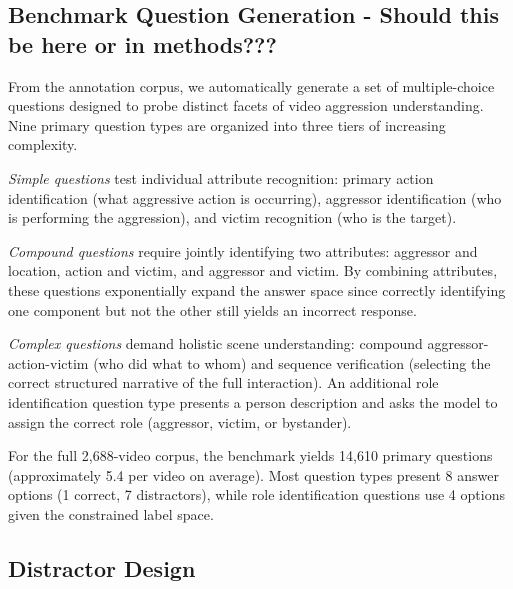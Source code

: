 \subsection{Benchmark Question Generation - Should this be here or in methods???}

From the annotation corpus, we automatically generate a set of multiple-choice questions designed to probe distinct facets of video aggression understanding.
Nine primary question types are organized into three tiers of increasing complexity.

\textit{Simple questions} test individual attribute recognition: primary action identification (what aggressive action is occurring), aggressor identification (who is performing the aggression), and victim recognition (who is the target).

\textit{Compound questions} require jointly identifying two attributes: aggressor and location, action and victim, and aggressor and victim.
By combining attributes, these questions exponentially expand the answer space since correctly identifying one component but not the other still yields an incorrect response.

\textit{Complex questions} demand holistic scene understanding: compound aggressor-action-victim (who did what to whom) and sequence verification (selecting the correct structured narrative of the full interaction).
An additional role identification question type presents a person description and asks the model to assign the correct role (aggressor, victim, or bystander).

For the full 2,688-video corpus, the benchmark yields 14,610 primary questions (approximately 5.4 per video on average).
Most question types present 8 answer options (1 correct, 7 distractors), while role identification questions use 4 options given the constrained label space.

\subsection{Distractor Design}

